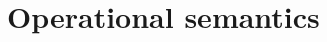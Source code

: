\documentclass[a4paper,UKenglish,numberwithinsect,pdfa,anonymous]{lipics-v2021}
\theoremstyle{restatestyle}
\newcommand\ansubst[2]{\ensuremath{\langle #1 \rangle_{#2}}}
\def\Pair#1#2{(#1,#2)} %
\def\Lam#1#2#3{\lambda#1^{#2}{.}#3} %
\def\letkeyword{\mathsf{let}}
\def\inkeyword{\mathsf{in}}
\def\LetP#1#2#3#4#5#6{\letkeyword\,\Pair{#1^{#2}}{#3^{#4}}=#5~\inkeyword~#6}
\def\gencase#1#2#3#4#5{\ensuremath{\mathsf{case}~#1~\mathsf{of}~\{#2\mapsto #4 \mid \dotsb \mid #3\mapsto #5\}}}
\def\lraneq{\rightsquigarrow}
\begin{document}
\section{Operational semantics}\label{sec:reduction}
%
\end{document}
